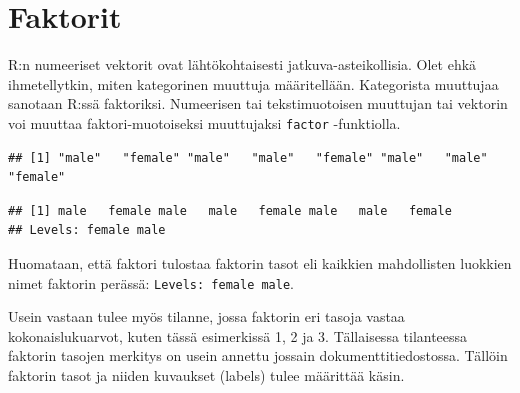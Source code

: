 \documentclass[
]{book}
\newenvironment{Shaded}{\begin{snugshade}}{\end{snugshade}}
\newcommand{\CommentTok}[1]{\textcolor[rgb]{0.56,0.35,0.01}{\textit{#1}}}
\newcommand{\FunctionTok}[1]{\textcolor[rgb]{0.00,0.00,0.00}{#1}}
\newcommand{\NormalTok}[1]{#1}
\newcommand{\OtherTok}[1]{\textcolor[rgb]{0.56,0.35,0.01}{#1}}
\newcommand{\SpecialCharTok}[1]{\textcolor[rgb]{0.00,0.00,0.00}{#1}}
\begin{document}
\hypertarget{faktorit}{%
\section{Faktorit}\label{faktorit}}

R:n numeeriset vektorit ovat lähtökohtaisesti jatkuva-asteikollisia. Olet ehkä ihmetellytkin, miten kategorinen muuttuja määritellään. Kategorista muuttujaa sanotaan R:ssä faktoriksi. Numeerisen tai tekstimuotoisen muuttujan tai vektorin voi muuttaa faktori-muotoiseksi muuttujaksi \texttt{factor} -funktiolla.

\begin{Shaded}
\end{Shaded}

\begin{verbatim}
## [1] "male"   "female" "male"   "male"   "female" "male"   "male"   "female"
\end{verbatim}

\begin{Shaded}
\end{Shaded}

\begin{verbatim}
## [1] male   female male   male   female male   male   female
## Levels: female male
\end{verbatim}

Huomataan, että faktori tulostaa faktorin tasot eli kaikkien mahdollisten luokkien nimet faktorin perässä: \texttt{Levels:\ female\ male}.

Usein vastaan tulee myös tilanne, jossa faktorin eri tasoja vastaa kokonaislukuarvot, kuten tässä esimerkissä 1, 2 ja 3. Tällaisessa tilanteessa faktorin tasojen merkitys on usein annettu jossain dokumenttitiedostossa. Tällöin faktorin tasot ja niiden kuvaukset (labels) tulee määrittää käsin.
\end{document}

